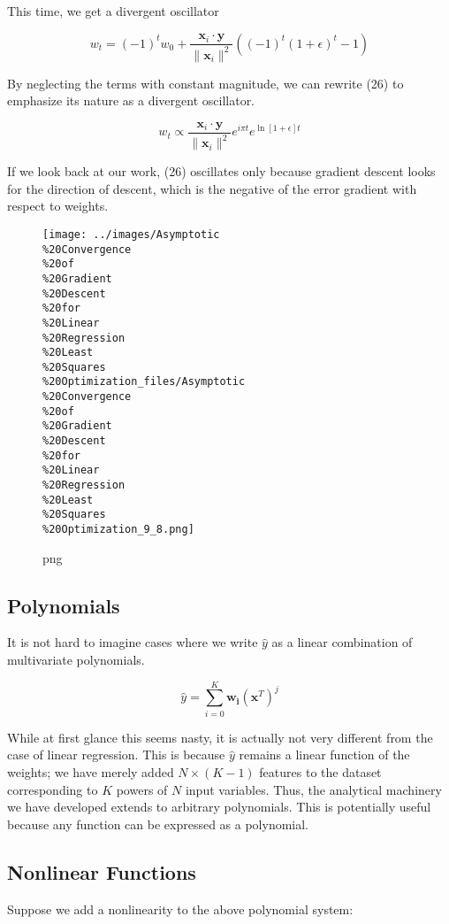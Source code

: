 \documentclass[]{article}
\begin{document}
This time, we get a divergent oscillator

\[
w_t =(-1)^t w_0 + \frac{\mathbf{x}_i \cdot \mathbf{y}}{\|\mathbf{x}_i\|^2}\left((-1)^t(1+ \epsilon)^t-1\right)
\]

By neglecting the terms with constant magnitude, we can rewrite (26) to
emphasize its nature as a divergent oscillator.

\[
w_t \propto \frac{\mathbf{x}_i \cdot \mathbf{y}}{\|\mathbf{x}_i\|^2}e^{i \pi t}e^{\ln{[1+\epsilon]}t}
\]

If we look back at our work, (26) oscillates only because gradient
descent looks for the direction of descent, which is the negative of the
error gradient with respect to weights.

\begin{figure}[htbp]
\centering
\texttt{[image: ../images/Asymptotic\\\%20Convergence\\\%20of\\\%20Gradient\\\%20Descent\\\%20for\\\%20Linear\\\%20Regression\\\%20Least\\\%20Squares\\\%20Optimization\_files/Asymptotic\\\%20Convergence\\\%20of\\\%20Gradient\\\%20Descent\\\%20for\\\%20Linear\\\%20Regression\\\%20Least\\\%20Squares\\\%20Optimization\_9\_8.png]}
\caption{png}
\end{figure}

\subsection{Polynomials}\label{polynomials}

It is not hard to imagine cases where we write \(\hat{y}\) as a linear
combination of multivariate polynomials.

\[
\hat{y} = \sum\limits_{i=0}^K\mathbf{w_i}\left(\mathbf{x}^{T}\right)^j
\]

While at first glance this seems nasty, it is actually not very
different from the case of linear regression. This is because
\(\hat{y}\) remains a linear function of the weights; we have merely
added \(N\times(K-1)\) features to the dataset corresponding to \(K\)
powers of \(N\) input variables. Thus, the analytical machinery we have
developed extends to arbitrary polynomials. This is potentially useful
because any function can be expressed as a polynomial.

\subsection{Nonlinear Functions}\label{nonlinear-functions}

Suppose we add a nonlinearity to the above polynomial system:
\end{document}
